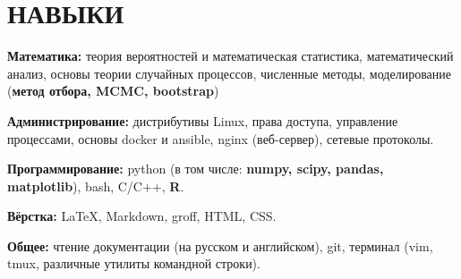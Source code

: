 \section{НАВЫКИ}

\begin{description}

    \setlength\itemsep{-0.4em}

    \item{\bfseries Математика:}
        теория вероятностей и математическая статистика, математический анализ,
        основы теории случайных процессов, численные методы, моделирование
        (\textbf{метод отбора, MCMC, bootstrap})

    \item{\bfseries Администрирование:}
        дистрибутивы Linux, права доступа, управление процессами, основы docker
        и ansible, nginx (веб-сервер), сетевые протоколы.
    
    \item{\bfseries Программирование:}
        python (в том числе: \textbf{numpy, scipy, pandas, matplotlib}), bash, C/C++, \textbf{R}.
    
    \item{\bfseries Вёрстка:}
        \LaTeX, Markdown, groff, HTML, CSS.

    \item{\bfseries Общее:}
        чтение документации (на русском и английском), git, терминал (vim,
        tmux, различные утилиты командной строки).

\end{description}
    
    \vspace{.7em}
